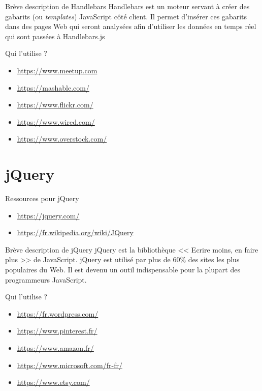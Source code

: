 \documentclass[presentation]{beamer}
\begin{document}
\begin{frame}[label={sec:org8b15622}]{Brève description de Handlebars}
Handlebars est un moteur servant à créer des gabarits (ou
\emph{templates}) JavaScript côté client. Il permet d'insérer ces
gabarits dans des pages Web qui seront analysées afin d'utiliser les
données en temps réel qui sont passées à Handlebars.js
\end{frame}

\begin{frame}[label={sec:orgf55bab2}]{Qui l'utilise ?}
\begin{itemize}
\item \url{https://www.meetup.com}
\item \url{https://mashable.com/}
\item \url{https://www.flickr.com/}
\item \url{https://www.wired.com/}
\item \url{https://www.overstock.com/}
\end{itemize}
\end{frame}

\section{jQuery}
\label{sec:org34228e1}
\begin{frame}[label={sec:orge2dc62a}]{Ressources pour jQuery}
\begin{itemize}
\item \url{https://jquery.com/}
\item \url{https://fr.wikipedia.org/wiki/JQuery}
\end{itemize}
\end{frame}

\begin{frame}[label={sec:orgccfac94}]{Brève description de jQuery}
jQuery est la bibliothèque << Ecrire moins, en faire plus >> de
JavaScript. jQuery est utilisé par plus de 60\% des sites les plus
populaires du Web. Il est devenu un outil indispensable pour la
plupart des programmeurs JavaScript.
\end{frame}

\begin{frame}[label={sec:org15138d2}]{Qui l'utilise ?}
\begin{itemize}
\item \url{https://fr.wordpress.com/}
\item \url{https://www.pinterest.fr/}
\item \url{https://www.amazon.fr/}
\item \url{https://www.microsoft.com/fr-fr/}
\item \url{https://www.etsy.com/}
\end{itemize}
\end{frame}
\end{document}
